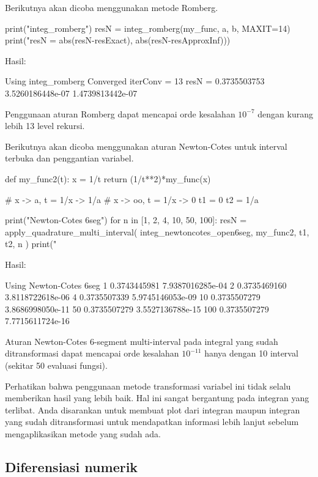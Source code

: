 Berikutnya akan dicoba menggunakan metode Romberg.
\begin{pythoncode}
print("\nUsing integ_romberg")
resN = integ_romberg(my_func, a, b, MAXIT=14)
print("resN = %
    abs(resN-resExact), abs(resN-resApproxInf)))
\end{pythoncode}

Hasil:
\begin{textcode}
Using integ_romberg
Converged
iterConv =  13
resN =       0.3735503753   3.5260186448e-07   1.4739813442e-07
\end{textcode}
Penggunaan aturan Romberg dapat mencapai orde kesalahan $10^{-7}$
dengan kurang lebih 13 level rekursi.

Berikutnya akan dicoba menggunakan aturan Newton-Cotes untuk interval terbuka
dan penggantian variabel.
\begin{pythoncode}
def my_func2(t):
    x = 1/t
    return (1/t**2)*my_func(x)

# x -> a, t = 1/x -> 1/a
# x -> oo, t = 1/x -> 0
t1 = 0
t2 = 1/a

print("\nUsing Newton-Cotes 6seg")
for n in [1, 2, 4, 10, 50, 100]:
    resN = apply_quadrature_multi_interval(
        integ_newtoncotes_open6seg, my_func2, t1, t2, n
    )
    print("%
\end{pythoncode}

Hasil:
\begin{textcode}
Using Newton-Cotes 6seg
    1       0.3743445981   7.9387016285e-04
    2       0.3735469160   3.8118722618e-06
    4       0.3735507339   5.9745146053e-09
   10       0.3735507279   3.8686998050e-11
   50       0.3735507279   3.5527136788e-15
  100       0.3735507279   7.7715611724e-16
\end{textcode}

Aturan Newton-Cotes 6-segment multi-interval pada integral yang sudah
ditransformasi dapat mencapai orde kesalahan $10^{-11}$ hanya dengan 10 interval
(sekitar 50 evaluasi fungsi).

Perhatikan bahwa penggunaan metode transformasi variabel ini tidak selalu
memberikan hasil yang lebih baik. Hal ini sangat bergantung pada integran yang
terlibat.
Anda disarankan untuk membuat plot dari integran maupun
integran yang sudah ditransformasi untuk mendapatkan informasi lebih lanjut
sebelum mengaplikasikan metode yang sudah ada.


\subsection{Diferensiasi numerik}

